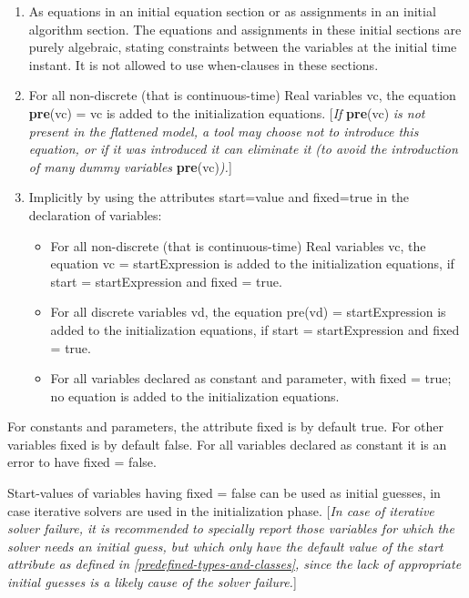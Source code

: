 \documentclass[10pt,a4paper]{report}
\begin{document}
\begin{enumerate}
\item
  As equations in an initial equation section or as assignments in an
  initial algorithm section. The equations and assignments in these
  initial sections are purely algebraic, stating constraints between the
  variables at the initial time instant. It is not allowed to use
  when-clauses in these sections.
\item
  For all non-discrete (that is continuous-time) Real variables vc, the
  equation \textbf{pre}(vc) = vc is added to the initialization
  equations. {[}\emph{If} \textbf{pre}(vc) \emph{is not present in the
  flattened model, a tool may choose not to introduce this equation, or
  if it was introduced it can eliminate it (to avoid the introduction of
  many dummy variables} \textbf{pre}(vc)\emph{).}{]}
\item
  Implicitly by using the attributes start=value and fixed=true in the
  declaration of variables:
\begin{itemize}
\item
  For all non-discrete (that is continuous-time) Real variables vc, the
  equation vc = startExpression is added to the initialization
  equations, if start = startExpression and fixed = true.
\item
  For all discrete variables vd, the equation pre(vd) = startExpression
  is added to the initialization equations, if start = startExpression
  and fixed = true.
\item
  For all variables declared as constant and parameter, with fixed =
  true; no equation is added to the initialization equations.
\end{itemize}
\end{enumerate}

For constants and parameters, the attribute fixed is by default true.
For other variables fixed is by default false. For all variables
declared as constant it is an error to have fixed = false.

Start-values of variables having fixed = false can be used as initial
guesses, in case iterative solvers are used in the initialization phase.
{[}\emph{In case of iterative solver failure, it is recommended to
specially report those variables for which the solver needs an initial
guess, but which only have the default value of the start attribute as
defined in \ref{predefined-types-and-classes}, since the lack of appropriate initial
guesses is a likely cause of the solver failure.}{]}
\end{document}
